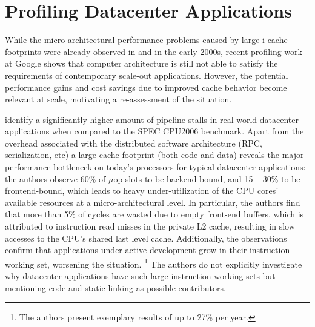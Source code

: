 \documentclass[12pt,a4paper]{book}
\begin{document}
\section{Profiling Datacenter Applications}\label{ch:relwork:profiling}

While the micro-architectural performance problems caused by large i-cache footprints were already observed in \cite{cohort} and \cite{steps} in the early 2000s,
recent profiling work at Google shows that computer architecture is still not able to satisfy the requirements of contemporary scale-out applications.
However, the potential performance gains and cost savings due to improved cache behavior become relevant at scale, motivating a re-assessment of the situation.

\citeauthor*{kanev2015profiling} identify a significantly higher amount of pipeline stalls in real-world datacenter applications when compared to the SPEC CPU2006 benchmark.
Apart from the overhead associated with the distributed software architecture (RPC, serialization, etc) %
a large cache footprint (both code and data) reveals the major performance bottleneck on today's processors for typical datacenter applications:
the authors observe 60\% of $\mu$op slots to be backend-bound, and 15 -- 30\% to be frontend-bound, which leads to heavy under-utilization of the CPU cores' available resources at a micro-architectural level.
In particular, the authors find that more than 5\% of cycles are wasted due to empty front-end buffers, which is attributed to instruction read misses in the private L2 cache, resulting in slow accesses to the CPU's shared last level cache.
Additionally, the observations confirm that applications under active development grow in their instruction working set, worsening the situation.%
\footnote{The authors present exemplary results of up to 27\% per year.}
The authors do not explicitly investigate why datacenter applications have such large instruction working sets but mentioning  code and static linking as possible contributors.~\cite{kanev2015profiling}
\end{document}
